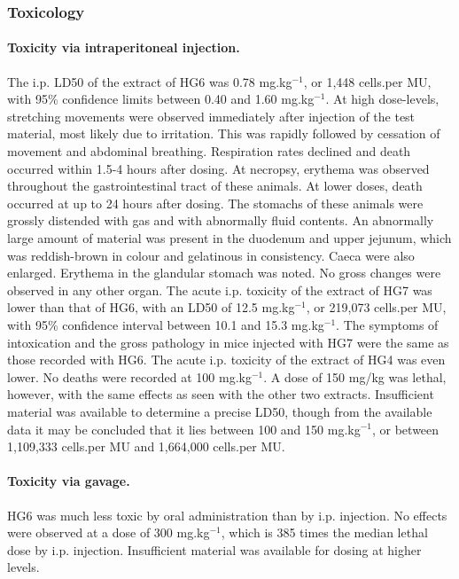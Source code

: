 \documentclass[12pt]{article}
\begin{document}
\subsubsection{Toxicology}

\paragraph{Toxicity via intraperitoneal injection.}
The i.p. LD50 of the extract of HG6 was 0.78 mg.kg$^{-1}$, or 1,448 cells.per MU, with 95\% confidence limits between 0.40 and 1.60 mg.kg$^{-1}$. 
At high dose-levels, stretching movements were observed immediately after injection of the test material, most likely due to irritation. 
This was rapidly followed by cessation of movement and abdominal breathing. 
Respiration rates declined and death occurred within 1.5-4 hours after dosing. 
At necropsy, erythema was observed throughout the gastrointestinal tract of these animals. 
At lower doses, death occurred at up to 24 hours after dosing. 
The stomachs of these animals were grossly distended with gas and with abnormally fluid contents. 
An abnormally large amount of material was present in the duodenum and upper jejunum, which was reddish-brown in colour and gelatinous in consistency. Caeca were also enlarged. 
Erythema in the glandular stomach was noted. No gross changes were observed in any other organ. 
The acute i.p. toxicity of the extract of HG7 was lower than that of HG6, with an LD50 of 12.5 mg.kg$^{-1}$, or 219,073 cells.per MU, with 95\% confidence interval between 10.1 and 15.3 mg.kg$^{-1}$. 
The symptoms of intoxication and the gross pathology in mice injected with HG7 were the same as those recorded with HG6. 
The acute i.p. toxicity of the extract of HG4 was even lower. 
No deaths were recorded at 100 mg.kg$^{-1}$. 
A dose of 150 mg/kg was lethal, however, with the same effects as seen with the other two extracts. 
Insufficient material was available to determine a precise LD50, though from the available data it may be concluded that it lies between 100 and 150 mg.kg$^{-1}$, or between 1,109,333 cells.per MU
and 1,664,000 cells.per MU.

\paragraph{Toxicity via gavage.}
 HG6 was much less toxic by oral administration than by i.p. injection. 
 No effects were observed at a dose of 300 mg.kg$^{-1}$, which is 385 times the median lethal dose by i.p. injection. 
 Insufficient material was available for dosing at higher levels.​
\end{document}
